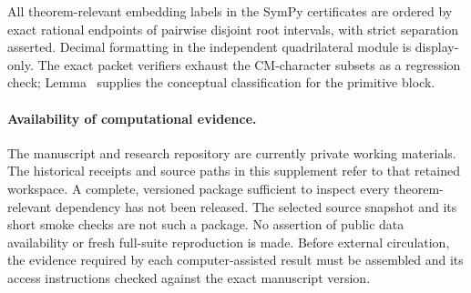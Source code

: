 All theorem-relevant embedding labels in the SymPy certificates are ordered
by exact rational endpoints of pairwise disjoint root intervals, with strict
separation asserted.  Decimal formatting in the independent quadrilateral
module is display-only.  The exact packet verifiers exhaust the CM-character
subsets as a regression check; Lemma~ supplies the
conceptual classification for the primitive block.


\paragraph{Availability of computational evidence.}
The manuscript and research repository are currently private working
materials. The historical receipts and source paths in this supplement refer
to that retained workspace. A complete, versioned package sufficient to
inspect every theorem-relevant dependency has not been released. The
selected source snapshot and its short smoke checks are not such a package.
No assertion of public data availability or fresh full-suite reproduction
is made. Before external circulation, the evidence required by each
computer-assisted result must be assembled and its access instructions
checked against the exact manuscript version.

